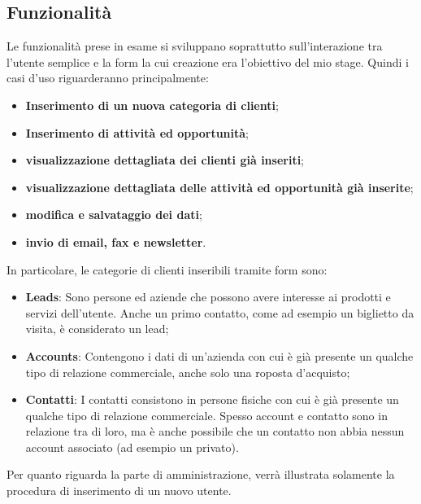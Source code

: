 \subsection{Funzionalità}
Le funzionalità prese in esame si sviluppano soprattutto sull'interazione tra l'utente semplice e la form la cui creazione era l'obiettivo del mio stage.
Quindi i casi d'uso riguarderanno principalmente:
\begin{itemize}
	\item \textbf{Inserimento di un nuova categoria di clienti};
	\item \textbf{Inserimento di attività ed opportunità};
	\item \textbf{visualizzazione dettagliata dei clienti già inseriti};
	\item \textbf{visualizzazione dettagliata delle attività ed opportunità già inserite};
	\item \textbf{modifica e salvataggio dei dati};
	\item \textbf{invio di email, fax e newsletter}.
\end{itemize}
In particolare, le categorie di clienti inseribili tramite form sono:
\begin{itemize}
	\item \textbf{Leads}: Sono persone ed aziende che possono avere interesse ai prodotti e servizi dell'utente. Anche un primo contatto, come ad esempio un biglietto da visita, è considerato un lead;
	\item \textbf{Accounts}: Contengono i dati di un'azienda con cui è già presente un qualche tipo di relazione commerciale, anche solo una roposta d'acquisto;
	\item \textbf{Contatti}: I contatti consistono in persone fisiche con cui è già presente un qualche tipo di relazione commerciale. Spesso account e contatto sono in relazione tra di loro, ma è anche possibile che un contatto non abbia nessun account associato (ad esempio un privato).
\end{itemize}
Per quanto riguarda la parte di amministrazione, verrà illustrata solamente la procedura di inserimento di un nuovo utente.

